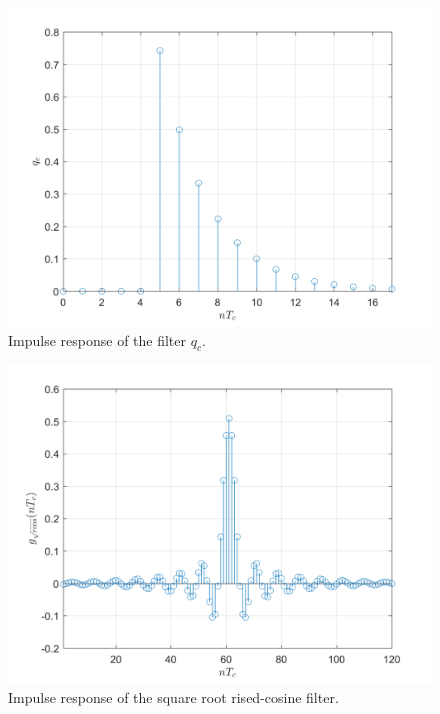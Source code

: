\documentclass[a4paper, 12pt]{report}
\begin{document}
\begin{figure}[H]
	\centering
	\includegraphics[width=14cm]{qc}
	\caption{Impulse response of the filter $q_c$.}
\end{figure}

\begin{figure}[H]
	\centering
	\includegraphics[width=14cm]{gsrrc_1}
	\caption{Impulse response of the square root rised-cosine filter.}
\end{figure}
\end{document}
